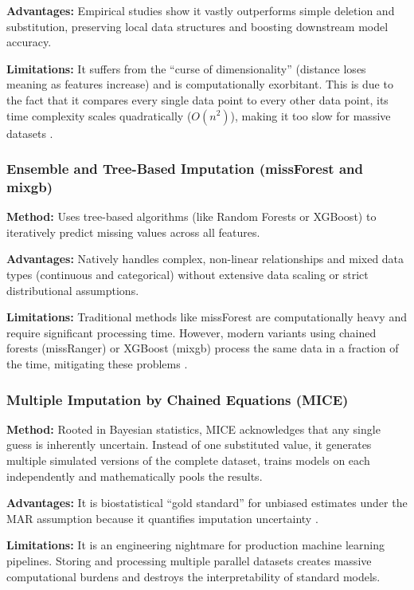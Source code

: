 \documentclass[journal]{IEEEtran}
\begin{document}
\noindent \textbf{Advantages:} Empirical studies show it vastly outperforms simple deletion and substitution, preserving local data structures and boosting downstream model accuracy.

\noindent \textbf{Limitations:} It suffers from the ``curse of dimensionality'' (distance loses meaning as features increase) and is computationally exorbitant. This is due to the fact that it compares every single data point to every other data point, its time complexity scales quadratically ($O(n^2)$), making it too slow for massive datasets \cite{suh2023comparison}.

\subsubsection{Ensemble and Tree-Based Imputation (missForest and mixgb)}

\noindent \textbf{Method:} Uses tree-based algorithms (like Random Forests or XGBoost) to iteratively predict missing values across all features.

\noindent \textbf{Advantages:} Natively handles complex, non-linear relationships and mixed data types (continuous and categorical) without extensive data scaling or strict distributional assumptions.

\noindent \textbf{Limitations:} Traditional methods like missForest are computationally heavy and require significant processing time. However, modern variants using chained forests (missRanger) or XGBoost (mixgb) process the same data in a fraction of the time, mitigating these problems \cite{suh2023comparison}.

\subsubsection{Multiple Imputation by Chained Equations (MICE)}

\noindent \textbf{Method:} Rooted in Bayesian statistics, MICE acknowledges that any single guess is inherently uncertain. Instead of one substituted value, it generates multiple simulated versions of the complete dataset, trains models on each independently and mathematically pools the results.

\noindent \textbf{Advantages:} It is biostatistical ``gold standard'' for unbiased estimates under the MAR assumption because it quantifies imputation uncertainty \cite{austin2021missing}.

\noindent \textbf{Limitations:} It is an engineering nightmare for production machine learning pipelines. Storing and processing multiple parallel datasets creates massive computational burdens and destroys the interpretability of standard models.
\end{document}

